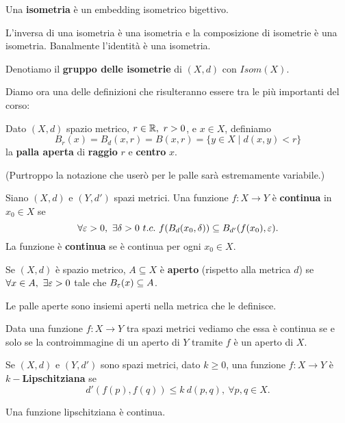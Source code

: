 \begin{multicols*}{2}
\begin{definition}[Isometria]
Una \textbf{isometria} è un embedding isometrico bigettivo.
\end{definition}
\begin{remark}
L'inversa di una isometria è una isometria e la composizione di isometrie è una isometria.
Banalmente l'identità è una isometria.
\end{remark}

\begin{notation}
Denotiamo il \textbf{gruppo delle isometrie} di $(X,d)$ con $Isom(X)$.
\end{notation}
\vspace{0.5cm}

\noindent Diamo ora una delle definizioni che risulteranno essere tra le più importanti del corso:
\begin{definition}
Dato $(X,d)$ spazio metrico, $r\in\mathbb{R},\ r>0$, e $x\in X$, definiamo \[B_r(x)=B_d(x,r)=B(x,r)=\{y\in X\mid d(x,y)<r\}\] la \textbf{palla aperta} di \textbf{raggio} $r$ e \textbf{centro} $x$.
\end{definition}
\noindent (Purtroppo la notazione che userò per le palle sarà estremamente variabile.)

\begin{definition}
Siano $(X,d)$ e $(Y,d')$ spazi metrici. Una funzione $f:X\to Y$ è \textbf{continua} in $x_0\in X$ se
\[\forall \e>0,\ \exists \delta>0\ t.c.\ f(B_d(x_0,\delta))\subseteq B_{d'}(f(x_0),\e).\]
La funzione è \textbf{continua} se è continua per ogni $x_0\in X$.
\end{definition}

\begin{definition}
Se $(X,d)$ è spazio metrico, $A\subseteq X$ è \textbf{aperto} (rispetto alla metrica $d$) se $\forall x\in A,\ \exists \varepsilon>0$ tale che $B_\varepsilon(x)\subseteq A$.
\end{definition}

\begin{lemma}
Le palle aperte sono insiemi aperti nella metrica che le definisce.
\end{lemma}

\begin{theorem}
Data una funzione $f:X\to Y$ tra spazi metrici vediamo che essa è continua se e solo se la controimmagine di un aperto di $Y$ tramite $f$ è un aperto di $X$.
\end{theorem}
\begin{definition}
Se $(X,d)$ e $(Y,d')$ sono spazi metrici, dato $k\geq 0$, una funzione $f:X\to Y$ è \textbf{$k-$Lipschitziana} se
\[d'(f(p),f(q))\leq k\ d(p,q),\ \forall p,q\in X.\]
\end{definition}
\begin{proposition}
Una funzione lipschitziana è continua.
\end{proposition}


\end{multicols*}
